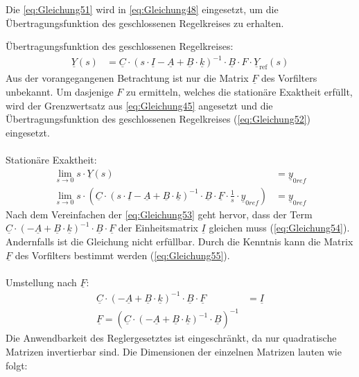 \newline
Die \autoref{eq:Gleichung51} wird in \autoref{eq:Gleichung48} eingesetzt, um die Übertragungsfunktion des geschlossenen Regelkreises zu erhalten.

\clearpage

Übertragungsfunktion des geschlossenen Regelkreises:
\begin{align}
        \underline{Y}(s) &= \underline{C}\cdot(s\cdot\underline{I}-\underline{A}+\underline{B}\cdot{\underline{k}})^{-1}\cdot\underline{B}\cdot F\cdot\underline{Y}_{\mathrm{ref}}(s) \label{eq:Gleichung52}
\end{align}
\newline
Aus der vorangegangenen Betrachtung ist nur die Matrix $\underline{F}$ des Vorfilters unbekannt. Um dasjenige $F$ zu ermitteln, welches die stationäre Exaktheit erfüllt, wird der Grenzwertsatz aus \autoref{eq:Gleichung45} angesetzt und die Übertragungsfunktion des geschlossenen Regelkreises (\autoref{eq:Gleichung52}) eingesetzt.\\\\
Stationäre Exaktheit:
\begin{align}
    \lim_{s \to 0} s\cdot \underline{Y}(s) &= \underline{y}_{0ref} \nonumber \\
    \lim_{s \to 0} s\cdot (\underline{C}\cdot(s\cdot\underline{I}-\underline{A}+\underline{B}\cdot{\underline{k}})^{-1}\cdot\underline{B}\cdot\underline{F}\cdot\frac{1}{s}\cdot\underline{y}_{0ref}) &= \underline{y}_{0ref} \label{eq:Gleichung53}
\end{align}
\newline
Nach dem Vereinfachen der \autoref{eq:Gleichung53} geht hervor, dass der Term $\underline{C}\cdot(-\underline{A}+\underline{B}\cdot{\underline{k}})^{-1}\cdot\underline{B}\cdot\underline{F}$ der Einheitsmatrix $\underline{I}$ gleichen muss (\autoref{eq:Gleichung54}). Andernfalls ist die Gleichung nicht erfüllbar. Durch die Kenntnis kann die Matrix $\underline{F}$ des Vorfilters bestimmt werden (\autoref{eq:Gleichung55}).\\\\
Umstellung nach $\underline{F}$:
\begin{align}
    \underline{C}\cdot(-\underline{A}+\underline{B}\cdot{\underline{k}})^{-1}\cdot\underline{B}\cdot\underline{F} &= \underline{I} \label{eq:Gleichung54}\\
    \underline{F} = (\underline{C}\cdot(-\underline{A}+\underline{B}\cdot{\underline{k}})^{-1}\cdot\underline{B})^{-1} \label{eq:Gleichung55}
\end{align}
\newline
Die Anwendbarkeit des Reglergesetztes ist eingeschränkt, da nur quadratische Matrizen invertierbar sind. Die Dimensionen der einzelnen Matrizen lauten wie folgt:

